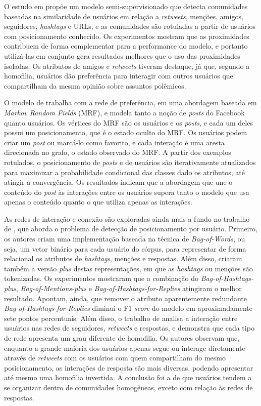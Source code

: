 \documentclass[
	12pt, oneside, a4paper, english, brazil
]{abntex2ppgsi}
\begin{document}
O estudo em  propõe um modelo semi-supervisionado que detecta comunidades baseadas na similaridade de usuários em relação a {\em retweets}, menções, amigos, seguidores, {\em hashtags} e URLs, e as comunidades são rotuladas a partir de usuários com posicionamento conhecido. Os experimentos mostram que as proximidades contribuem de forma complementar para a performance do modelo, e portanto utilizá-las em conjunto gera resultados melhores que o uso das proximidades isoladas. Os atributos de amigos e {\em retweets} tiveram destaque, já que, segundo a homofilia, usuários dão preferência para interagir com outros usuários que compartilham da mesma opinião sobre assuntos polêmicos.

O modelo de  trabalha com a rede de preferência, em uma abordagem baseada em {\em Markov Random Fields} (MRF), e modela tanto a noção de {\em posts} do Facebook quanto usuários. Os vértices do MRF são os usuários e os {\em posts}, e cada um deles possui um posicionamento, que é o estado oculto do MRF. Os usuários podem criar um {\em post} ou marcá-lo como favorito, e cada interação é uma aresta direcionada no grafo, o estado observado do MRF. A partir dos exemplos rotulados, o posicionamento de {\em posts} e de usuários são iterativamente atualizados para maximizar a probabilidade condicional das classes dado os atributos, até atingir a convergência. Os resultados indicam que a abordagem que une o conteúdo do {\em post} às interações entre os usuários supera tanto o modelo que usa apenas o conteúdo quanto o que utiliza apenas as interações.

As redes de interação e conexão são exploradas ainda mais a fundo no trabalho de , que aborda o problema de detecção de posicionamento por usuário. Primeiro, os autores criam uma implementação baseada na técnica de {\em Bag-of-Words}, ou seja, um vetor binário para cada usuário do córpus, para representar de forma relacional os atributos de {\em hashtags}, menções e respostas. Além disso, criaram também a versão {\em plus} destas representações, em que as {\em hashtags} ou menções são tokenizadas. Os experimentos mostraram que a combinação do {\em Bag-of-Hashtags-plus}, {\em Bag-of-Mentions-plus} e {\em Bag-of-Hashtags-for-Replies} atingiram o melhor resultado. Apontam, ainda, que remover o atributo aparentemente redundante {\em Bag-of-Hashtags-for-Replies} diminui o F1 {\em score} do modelo em aproximadamente sete pontos percentuais. Além disso, o trabalho de  analisa a interação entre usuários nas redes de seguidores, {\em retweets} e respostas, e demonstra que cada tipo de rede apresenta um grau diferente de homofilia. Os autores observam que, enquanto a grande maioria dos usuários apenas segue ou interage diretamente através de {\em retweets} com os usuários com quem compartilham do mesmo posicionamento, as interações de resposta são mais diversas, podendo apresentar até mesmo uma homofilia invertida. A conclusão foi a de que usuários tendem a se organizar dentro de comunidades homogêneas, exceto com relação às redes de respostas.
\end{document}
